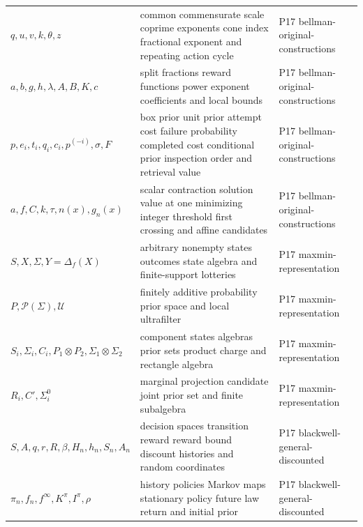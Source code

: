 \begin{longtable}{@{}p{}p{}p{}@{}}
\(q,\allowbreak u,\allowbreak v,\allowbreak k,\allowbreak \theta,\allowbreak z\) & common commensurate scale coprime exponents cone index fractional exponent and repeating action cycle & P17 bellman-\allowbreak{}original-\allowbreak{}constructions \\
\(a,\allowbreak b,\allowbreak g,\allowbreak h,\allowbreak \lambda,\allowbreak A,\allowbreak B,\allowbreak K,\allowbreak c\) & split fractions reward functions power exponent coefficients and local bounds & P17 bellman-\allowbreak{}original-\allowbreak{}constructions \\
\(p,\allowbreak e_i,\allowbreak t_i,\allowbreak q_i,\allowbreak c_i,\allowbreak p^{(-i)},\allowbreak \sigma,\allowbreak F\) & box prior unit prior attempt cost failure probability completed cost conditional prior inspection order and retrieval value & P17 bellman-\allowbreak{}original-\allowbreak{}constructions \\
\(a,\allowbreak f,\allowbreak C,\allowbreak k,\allowbreak \tau,\allowbreak n(x),\allowbreak g_n(x)\) & scalar contraction solution value at one minimizing integer threshold first crossing and affine candidates & P17 bellman-\allowbreak{}original-\allowbreak{}constructions \\
\(S,\allowbreak X,\allowbreak \Sigma,\allowbreak Y=\Delta_f(X)\) & arbitrary nonempty states outcomes state algebra and finite-support lotteries & P17 maxmin-\allowbreak{}representation \\
\(P,\allowbreak \mathcal P(\Sigma),\allowbreak \mathcal U\) & finitely additive probability prior space and local ultrafilter & P17 maxmin-\allowbreak{}representation \\
\(S_i,\allowbreak \Sigma_i,\allowbreak C_i,\allowbreak P_1\otimes P_2,\allowbreak \Sigma_1\otimes\Sigma_2\) & component states algebras prior sets product charge and rectangle algebra & P17 maxmin-\allowbreak{}representation \\
\(R_i,\allowbreak C',\allowbreak \Sigma_i^0\) & marginal projection candidate joint prior set and finite subalgebra & P17 maxmin-\allowbreak{}representation \\
\(S,\allowbreak A,\allowbreak q,\allowbreak r,\allowbreak R,\allowbreak \beta,\allowbreak H_n,\allowbreak h_n,\allowbreak S_n,\allowbreak A_n\) & decision spaces transition reward reward bound discount histories and random coordinates & P17 blackwell-\allowbreak{}general-\allowbreak{}discounted \\
\(\pi_n,\allowbreak f_n,\allowbreak f^\infty,\allowbreak K^\pi,\allowbreak I^\pi,\allowbreak \rho\) & history policies Markov maps stationary policy future law return and initial prior & P17 blackwell-\allowbreak{}general-\allowbreak{}discounted \\

\end{longtable}
